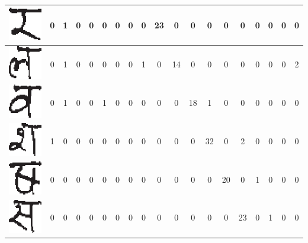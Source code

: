 \begin{table}[h]
\begin{tabular}{|c|c|c|c|c|c|c|c|c|c|c|c|c|c|c|c|c|c|c|}
\hline
\includegraphics[scale=0.25]{figures/datasets/nhcr/consonants/27ra} & 0 & 1 & 0 & 0 & 0 & 0 & 0 & 0 & 23 & 0 & 0 & 0 & 0 & 0 & 0 & 0 & 0 & 0\tabularnewline
\hline
\includegraphics[scale=0.25]{figures/datasets/nhcr/consonants/28la} & 0 & 1 & 0 & 0 & 0 & 0 & 0 & 1 & 0 & 14 & 0 & 0 & 0 & 0 & 0 & 0 & 0 & 2\tabularnewline
\hline
\includegraphics[scale=0.25]{figures/datasets/nhcr/consonants/29wa} & 0 & 1 & 0 & 0 & 1 & 0 & 0 & 0 & 0 & 0 & 18 & 1 & 0 & 0 & 0 & 0 & 0 & 0\tabularnewline
\hline
\includegraphics[scale=0.25]{figures/datasets/nhcr/consonants/30sa} & 1 & 0 & 0 & 0 & 0 & 0 & 0 & 0 & 0 & 0 & 0 & 32 & 0 & 2 & 0 & 0 & 0 & 0\tabularnewline
\hline
\includegraphics[scale=0.25]{figures/datasets/nhcr/consonants/31khasa} & 0 & 0 & 0 & 0 & 0 & 0 & 0 & 0 & 0 & 0 & 0 & 0 & 20 & 0 & 1 & 0 & 0 & 0\tabularnewline
\hline
\includegraphics[scale=0.25]{figures/datasets/nhcr/consonants/32saa} & 0 & 0 & 0 & 0 & 0 & 0 & 0 & 0 & 0 & 0 & 0 & 0 & 0 & 23 & 0 & 1 & 0 & 0\tabularnewline

\end{tabular}
\end{table}
